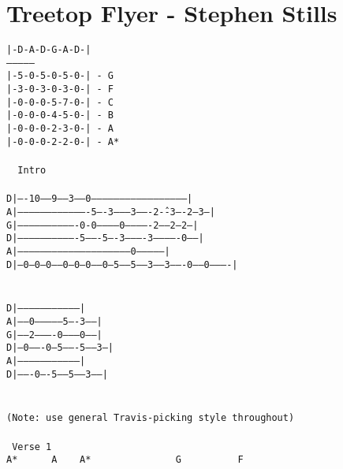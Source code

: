 \newpage
\section{Treetop Flyer - Stephen Stills}
\label{Treetop Flyer - Stephen Stills}
\texttt{|-D-A-D-G-A-D-|\\
---------------\\
|-5-0-5-0-5-0-|\ -\ G\\
|-3-0-3-0-3-0-|\ -\ F\\
|-0-0-0-5-7-0-|\ -\ C\\
|-0-0-0-4-5-0-|\ -\ B\\
|-0-0-0-2-3-0-|\ -\ A\\
|-0-0-0-2-2-0-|\ -\ A*\\
\\
\ \lbrack\ Intro\rbrack\\
\\
D|----10-----9-----3-----0---------------------------------------------------|\\
A|-------------------------------------5----3---------3-------2\^--3----2---3---|\\
G|-------------------------------0-0------------0-------------2------2---2---|\\
D|-------------------------------5-------5----3----------3-------------0-----|\\
A|------------------------------------------------------------0--------------|\\
D|--0--0--0-----0--0--0-----0--5-----5------3------3-------0------0----------|\\
\\
\\
D|--------------------------------|\\
A|-----0--------------5----3------|\\
G|-----2----------0--------0------|\\
D|--0-------0---5-------5-----3---|\\
A|--------------------------------|\\
D|-------0----5-----5------3------|\\
\\
\\
(Note:\ use\ general\ Travis-picking\ style\ throughout)\\
\\
\lbrack\ Verse\ 1\rbrack\\
A*\ \ \ \ \ \ A\ \ \ \ A*\ \ \ \ \ \ \ \ \ \ \ \ \ \ \ G\ \ \ \ \ \ \ \ \ \ F\\
}
